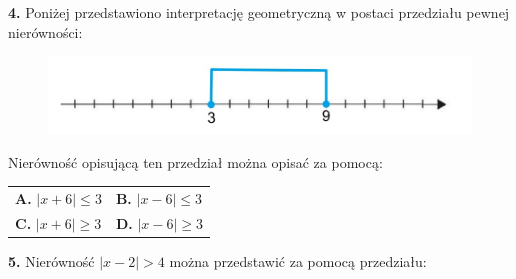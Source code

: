 \documentclass[12pt,a4paper]{article}
\theoremstyle{break}
\begin{document}
					\begin{mdframed}[%
		linecolor=white,%
		innertopmargin=\topskip,
		shadowsize=0,%
		innertopmargin=5,%
		innerbottommargin=5,%
		leftmargin=10,%
		rightmargin=10,%
		backgroundcolor=gray!20,%
		innertopmargin=0pt,]
		\vspace{0.2cm}
		\textbf{4.} Poniżej przedstawiono interpretację geometryczną w postaci przedziału pewnej nierówności:
	\end{mdframed}

	\begin{figure}[h]
		\centering
		\includegraphics[scale=0.5]{z1_1.jpeg}
	\end{figure}
	
	Nierówność opisującą ten przedział można opisać za pomocą:
	
		\vspace{0.5cm}
	\begin{tabular}{p{5cm} p{5cm}}
		\textbf{A. }$|x+6|\leq3$&
		\textbf{B. }$|x-6|\leq3$\\
		\textbf{C. }$|x+6|\geq3$&
		\textbf{D. }$|x-6|\geq3$\\
	\end{tabular}

					\begin{mdframed}[%
	linecolor=white,%
	innertopmargin=\topskip,
	shadowsize=0,%
	innertopmargin=5,%
	innerbottommargin=5,%
	leftmargin=10,%
	rightmargin=10,%
	backgroundcolor=gray!20,%
	innertopmargin=0pt,]
	\vspace{0.2cm}
	\textbf{5.} Nierówność $|x-2|>4$ można przedstawić za pomocą przedziału:
\end{mdframed}
\end{document}
